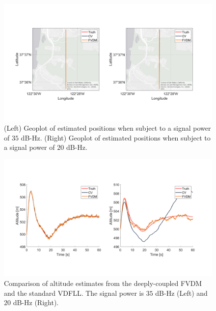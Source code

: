 \begin{figure}[!ht]
    \centering
    \includegraphics[width=\linewidth]{Figures/resultsv2/Slide1.PNG}
    \caption{(Left) Geoplot of estimated positions when subject to a signal power of \(35\) dB-Hz. (Right) Geoplot of estimated positions when subject to a signal power of \(20\) dB-Hz.}\label{fig:positionerror451}
\end{figure}

\begin{figure}[!ht]
    \centering
    \includegraphics[width=\linewidth]{Figures/resultsv2/Slide12.PNG}
    \caption{Comparison of altitude estimates from the deeply-coupled FVDM and the standard VDFLL\@. The signal power is \(35\) dB-Hz (Left) and \(20\) dB-Hz (Right).}\label{fig:fixthis5}
\end{figure}

